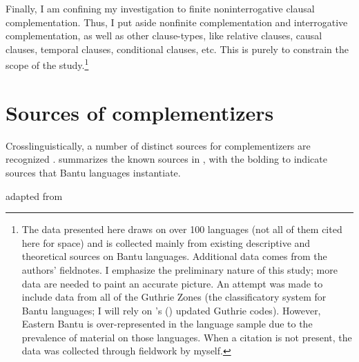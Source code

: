 \documentclass[output=paper,colorlinks,citecolor=brown,
]{langscibook}
\begin{document}
Finally, I am confining my investigation to finite noninterrogative clausal complementation. Thus, I put aside nonfinite complementation and interrogative complementation, as well as other clause-types, like relative clauses, causal clauses, temporal clauses, conditional clauses, etc. This is purely to constrain the scope of the study.\footnote{The data presented here draws on over 100 languages (not all of them cited here for space) and is collected mainly from existing descriptive and theoretical sources on Bantu languages. Additional data comes from the authors' fieldnotes. I emphasize the preliminary nature of this study; more data are needed to paint an accurate picture. An attempt was made to include data from all of the Guthrie Zones (the classificatory system for Bantu languages; I will rely on \citeauthor{Hammarstrom:2019}'s (\citeyear{Hammarstrom:2019}) updated Guthrie codes). However,  Eastern Bantu is  over-represented in the language sample due to the prevalence of material on those languages. When a citation is not present, the data was collected through  fieldwork by myself.} 
 



\section{Sources of complementizers}\label{sec:gluckman:sources}


Crosslinguistically, a number of distinct sources for complementizers are recognized \citep{HopperTraugott:1993, Guldemann:2008, Kutevaetal:2019}. \citet{Chappell:2008} summarizes the known sources in , with the bolding to indicate sources that Bantu languages instantiate.

\ea\label{ex:gluckman:list}
\begin{xlist}
 \hfill adapted from \citet[3]{Chappell:2008}

\end{xlist}
\z
\end{document}
